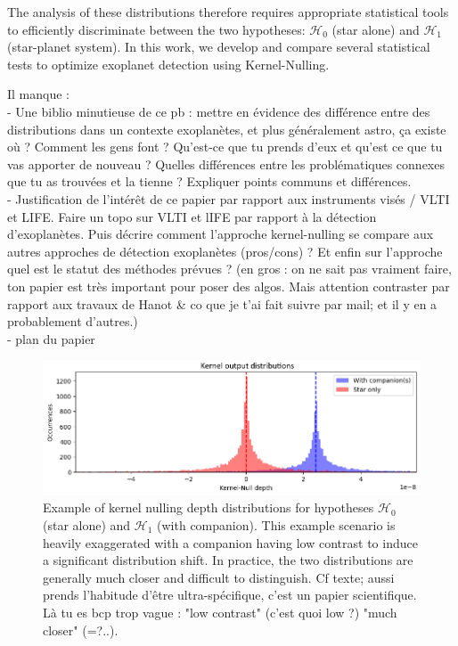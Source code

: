 \documentclass{article}
\newcommand{\dm}[1]{{\color{mulberry} #1}}
\begin{document}
The analysis of these distributions therefore requires appropriate statistical tools to efficiently discriminate between the two hypotheses: $\mathcal{H}_0$ (star alone) and $\mathcal{H}_1$ (star-planet system). In this work, we develop and compare several statistical tests to optimize exoplanet detection using Kernel-Nulling.

\dm{Il manque :\\
- Une biblio minutieuse de ce pb : mettre en évidence des différence entre des distributions dans un contexte exoplanètes, et plus généralement astro, ça existe où ? Comment les gens font ? Qu'est-ce que tu prends d'eux et qu'est ce que tu vas apporter de nouveau ? Quelles différences entre les problématiques connexes que tu as trouvées et la tienne ? Expliquer points communs et différences.\\
- Justification de l'intérêt de ce papier par rapport aux instruments visés / VLTI et LIFE. Faire un topo sur VLTI et lIFE par rapport à la détection d'exoplanètes. Puis décrire comment l'approche kernel-nulling se compare aux autres approches de détection exoplanètes (pros/cons) ? Et enfin sur l'approche quel est le statut des méthodes prévues ? (en gros : on ne sait pas vraiment faire, ton papier est très important pour poser des algos. Mais attention contraster par rapport aux travaux de Hanot \& co que je t'ai fait suivre par mail; et il y en a probablement d'autres.)\\ 
- plan du papier}

\begin{figure}[H]
\centering
\includegraphics[width=\linewidth]{img/output_distribution.png}
\caption{Example of kernel nulling depth distributions for hypotheses $\mathcal{H}_0$ (star alone) and $\mathcal{H}_1$ (with companion). This example scenario is heavily exaggerated with a companion having low contrast to induce a significant distribution shift. In practice, the two distributions are generally much closer and difficult to distinguish.\dm{Cf texte; aussi prends l'habitude d'être ultra-spécifique, c'est un papier scientifique. Là tu es bcp trop vague : "low contrast" (c'est quoi low ?) "much closer" (=?..)}.}
\label{fig:distribution}
\end{figure}
\end{document}
